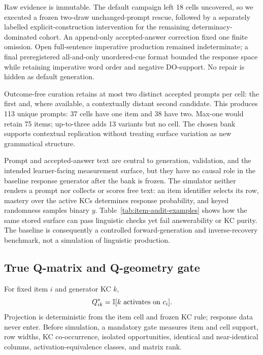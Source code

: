 Raw evidence is immutable.  The default campaign left 18 cells uncovered, so
we executed a frozen two-draw unchanged-prompt rescue, followed by a separately
labelled explicit-construction intervention for the remaining
determinacy-dominated cohort.  An append-only accepted-answer correction fixed
one finite omission.  Open full-sentence imperative production remained
indeterminate; a final preregistered all-and-only unordered-cue format bounded
the response space while retaining imperative word order and negative
DO-support.  No repair is hidden as default generation.

Outcome-free curation retains at most two distinct accepted prompts per cell:
the first and, where available, a contextually distant second candidate.
This produces 113 unique prompts: 37 cells have one item and 38 have two.
Max-one would retain 75 items; up-to-three adds 13 variants but no cell.  The
chosen bank supports contextual replication without treating surface
variation as new grammatical structure.

Prompt and accepted-answer text are central to generation, validation, and the
intended learner-facing measurement surface, but they have no causal role in the
baseline response generator after the bank is frozen.  The simulator neither
renders a prompt nor collects or scores free text: an item identifier selects
its \qstar{} row, mastery over the active KCs determines response probability,
and keyed randomness samples binary $y$.  Table~\ref{tab:item-audit-examples}
shows how the same stored surface can pass linguistic checks yet fail
answerability or KC purity.  The baseline is consequently a
controlled forward-generation and inverse-recovery benchmark, not a simulation
of linguistic production.

\subsection{True Q-matrix and Q-geometry gate}

For fixed item $i$ and generator KC $k$,
\begin{equation}
 Q^{*}_{ik}=\mathbb{I}[k\text{ activates on }c_i].
\end{equation}
Projection is deterministic from the item cell and frozen KC rule; response
data never enter.  Before simulation, a mandatory gate measures item and cell
support, row widths, KC co-occurrence, isolated opportunities, identical and
near-identical columns, activation-equivalence classes, and matrix rank.

